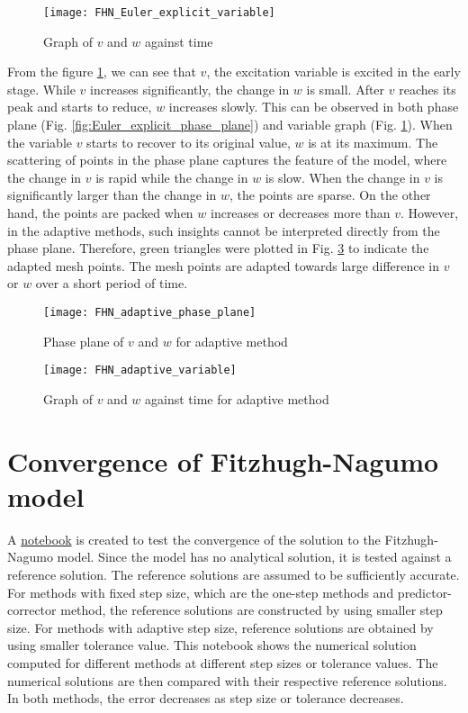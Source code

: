 \begin{figure}
    \texttt{[image: FHN\_Euler\_explicit\_variable]}
    \caption{Graph of $v$ and $w$ against time}
    \label{fig:Euler_explicit_variable}
\end{figure}


From the figure \ref{fig:Euler_explicit_variable}, we can see that $v$, the excitation variable is excited in the early stage. While $v$ increases significantly, the change in $w$ is small. After $v$ reaches its peak and starts to reduce, $w$ increases slowly. This can be observed in both phase plane (Fig. \ref{fig:Euler_explicit_phase_plane}) and variable graph (Fig. \ref{fig:Euler_explicit_variable}). When the variable $v$ starts to recover to its original value, $w$ is at its maximum. The scattering of points in the phase plane captures the feature of the model, where the change in $v$ is rapid while the change in $w$ is slow. When the change in $v$ is significantly larger than the change in $w$, the points are sparse. On the other hand, the points are packed when $w$ increases or decreases more than $v$. However, in the adaptive methods, such insights cannot be interpreted directly from the phase plane. Therefore, green triangles were plotted in Fig. \ref{fig:adaptive_variable} to indicate the adapted mesh points. The mesh points are adapted towards large difference in $v$ or $w$ over a short period of time.

\begin{figure}
    \texttt{[image: FHN\_adaptive\_phase\_plane]}
    \caption{Phase plane of $v$ and $w$ for adaptive method}
    \label{fig:adaptive_phase_plane}
\end{figure}

\begin{figure}
    \texttt{[image: FHN\_adaptive\_variable]}
    \caption{Graph of $v$ and $w$ against time for adaptive method}
    \label{fig:adaptive_variable}
\end{figure}

\section{Convergence of Fitzhugh-Nagumo model}
A \href{https://nbviewer.jupyter.org/github/FarmHJ/numerical-solver/blob/main/examples/fhn_model_convergence.ipynb}{notebook} is created to test the convergence of the solution to the Fitzhugh-Nagumo model. Since the model has no analytical solution, it is tested against a reference solution. The reference solutions are assumed to be sufficiently accurate. For methods with fixed step size, which are the one-step methods and predictor-corrector method, the reference solutions are constructed by using smaller step size. For methods with adaptive step size, reference solutions are obtained by using smaller tolerance value. This notebook shows the numerical solution computed for different methods at different step sizes or tolerance values. The numerical solutions are then compared with their respective reference solutions. In both methods, the error decreases as step size or tolerance decreases.

